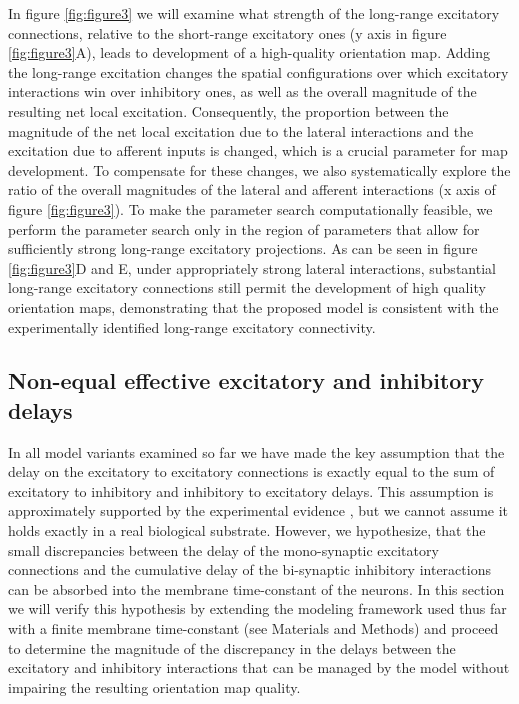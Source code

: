 \documentclass[utf8]{frontiersSCNS}
\begin{document}
In figure \ref{fig:figure3} we will examine what strength of the long-range excitatory connections, relative to the short-range excitatory ones (y axis in figure \ref{fig:figure3}A), leads to development of a high-quality orientation map.
Adding the long-range excitation changes the spatial configurations over which excitatory interactions win over inhibitory ones, as well as the 
overall magnitude of the resulting net local excitation. Consequently, the proportion between the magnitude of the net local excitation due to the lateral interactions and the excitation
due to afferent inputs is changed, which is a crucial parameter for map development. To compensate for these changes, we also systematically explore the ratio of the overall magnitudes of the lateral and afferent 
interactions (x axis of figure \ref{fig:figure3}). To make the parameter search computationally feasible, we perform the parameter search only in the region of parameters that allow for sufficiently strong
long-range excitatory projections. As can be seen in figure \ref{fig:figure3}D and E, under appropriately strong lateral interactions, substantial long-range excitatory connections still permit the development of high quality orientation maps, demonstrating that the proposed model is consistent with the experimentally identified long-range excitatory connectivity.



\subsection{Non-equal effective excitatory and inhibitory delays} \label{sec:SM4}

In all model variants examined so far we have made the key assumption that the delay on the excitatory to excitatory connections is exactly equal 
to the sum of excitatory to inhibitory and inhibitory to excitatory delays. This assumption is approximately supported by the experimental evidence 
\citep{Ohana2012}, but we cannot assume it holds exactly in a real biological substrate.  However, we hypothesize, that the small discrepancies between the delay of the mono-synaptic excitatory connections and the cumulative delay of the bi-synaptic inhibitory interactions can be absorbed into the membrane time-constant of the neurons. In this section we will verify this hypothesis by extending the modeling framework used thus far with a finite membrane time-constant (see Materials and Methods) and proceed to determine the magnitude of the discrepancy in the delays between the excitatory and inhibitory interactions that can be managed by the model without impairing the resulting orientation map quality. 
\end{document}
